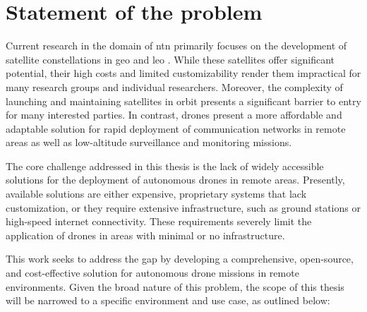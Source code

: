 \chapter{Statement of the problem}\label{ch:statement_of_problem}

Current research in the domain of \gls{ntn} primarily focuses on the development of satellite constellations in \gls{geo} and \gls{leo} \autocite{non_terrestial_networks_trends}. While these satellites offer significant potential, their high costs and limited customizability render them impractical for many research groups and individual researchers. Moreover, the complexity of launching and maintaining satellites in orbit presents a significant barrier to entry for many interested parties. In contrast, drones present a more affordable and adaptable solution for rapid deployment of communication networks in remote areas as well as low-altitude surveillance and monitoring missions.

The core challenge addressed in this thesis is the lack of widely accessible solutions for the deployment of autonomous drones in remote areas. Presently, available solutions are either expensive, proprietary systems that lack customization, or they require extensive infrastructure, such as ground stations or high-speed internet connectivity. These requirements severely limit the application of drones in areas with minimal or no infrastructure.

This work seeks to address the gap by developing a comprehensive, open-source, and cost-effective solution for autonomous drone missions in remote environments. Given the broad nature of this problem, the scope of this thesis will be narrowed to a specific environment and use case, as outlined below:

